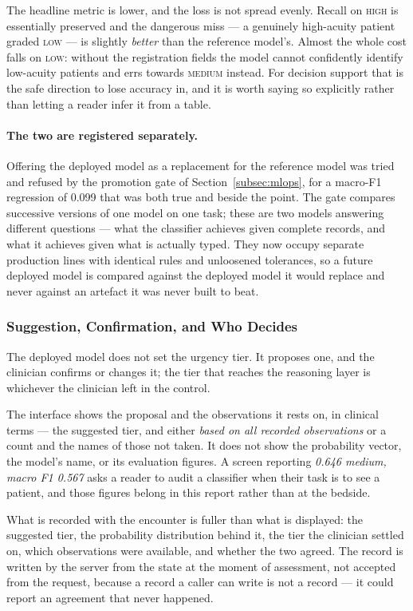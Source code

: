 The headline metric is lower, and the loss is not spread evenly. Recall on \textsc{high} is
essentially preserved and the dangerous miss --- a genuinely high-acuity patient graded
\textsc{low} --- is slightly \emph{better} than the reference model's. Almost the whole cost
falls on \textsc{low}: without the registration fields the model cannot confidently identify
low-acuity patients and errs towards \textsc{medium} instead. For decision support that is the
safe direction to lose accuracy in, and it is worth saying so explicitly rather than letting a
reader infer it from a table.

\paragraph{The two are registered separately.} Offering the deployed model as a replacement for
the reference model was tried and refused by the promotion gate of
Section~\ref{subsec:mlops}, for a macro-F1 regression of 0.099 that was both true and beside
the point. The gate compares successive versions of one model on one task; these are two models
answering different questions --- what the classifier achieves given complete records, and what
it achieves given what is actually typed. They now occupy separate production lines with
identical rules and unloosened tolerances, so a future deployed model is compared against the
deployed model it would replace and never against an artefact it was never built to beat.

\subsubsection{Suggestion, Confirmation, and Who Decides}

The deployed model does not set the urgency tier. It proposes one, and the clinician confirms
or changes it; the tier that reaches the reasoning layer is whichever the clinician left in the
control.

The interface shows the proposal and the observations it rests on, in clinical terms --- the
suggested tier, and either \emph{based on all recorded observations} or a count and the names
of those not taken. It does not show the probability vector, the model's name, or its
evaluation figures. A screen reporting \emph{0.646 medium, macro F1 0.567} asks a reader to
audit a classifier when their task is to see a patient, and those figures belong in this report
rather than at the bedside.

What is recorded with the encounter is fuller than what is displayed: the suggested tier, the
probability distribution behind it, the tier the clinician settled on, which observations were
available, and whether the two agreed. The record is written by the server from the state at
the moment of assessment, not accepted from the request, because a record a caller can write is
not a record --- it could report an agreement that never happened.

